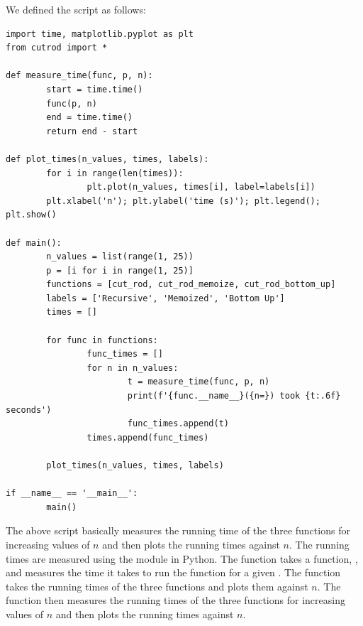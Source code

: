 \documentclass[addpoints]{exam}
\begin{document}
\begin{questions}
    
    \newpage
    \begin{solution}
			We defined the  script as follows:
			\begin{lstlisting}[style=mystyle]
import time, matplotlib.pyplot as plt
from cutrod import *

def measure_time(func, p, n):
		start = time.time()
		func(p, n)
		end = time.time()
		return end - start

def plot_times(n_values, times, labels):
		for i in range(len(times)):
				plt.plot(n_values, times[i], label=labels[i])
		plt.xlabel('n'); plt.ylabel('time (s)'); plt.legend(); plt.show()

def main():
		n_values = list(range(1, 25))
		p = [i for i in range(1, 25)]
		functions = [cut_rod, cut_rod_memoize, cut_rod_bottom_up]
		labels = ['Recursive', 'Memoized', 'Bottom Up']
		times = []

		for func in functions:
				func_times = []
				for n in n_values:
						t = measure_time(func, p, n)
						print(f'{func.__name__}({n=}) took {t:.6f} seconds')
						func_times.append(t)
				times.append(func_times)
		
		plot_times(n_values, times, labels)

if __name__ == '__main__':
		main()
\end{lstlisting}

The above script basically measures the running time of the three functions for increasing values of $n$ and then plots the running times against $n$. The running times are measured using the  module in Python. The  function takes a function, , and measures the time it takes to run the function for a given . The  function takes the running times of the three functions and plots them against $n$. The  function then measures the running times of the three functions for increasing values of $n$ and then plots the running times against $n$.


\end{solution}
\end{questions}
\end{document}
